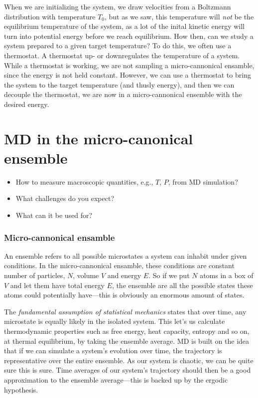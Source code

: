 \documentclass[a4paper, 11pt, notitlepage, english]{article}
\begin{document}
When we are initializing the system, we draw velocities from a Boltzmann distribution with temperature $T_0$, but as we saw, this temperature will \emph{not} be the equilibrium temperature of the system, as a lot of the inital kinetic energy will turn into potential energy before we reach equilibrium. How then, can we study a system prepared to a given target temperature? To do this, we often use a thermostat. A thermostat up- or downregulates the temperature of a system. While a thermostat is working, we are not sampling a micro-cannonical ensamble, since the energy is not held constant. However, we can use a thermostat to bring the system to the target temperature (and thusly energy), and then we can decouple the thermostat, we are now in a micro-cannonical ensemble with the desired energy. 

\clearpage


\section{MD in the micro-canonical ensemble}
\begin{itemize}
\item How to measure macroscopic quantities, e.g., $T$, $P$, from MD simulation?
\item What challenges do you expect? 
\item What can it be used for?
\end{itemize}

\subsubsection*{Micro-cannonical ensamble}


An ensemble refers to all possible microstates a system can inhabit under given conditions. In the micro-cannonical ensamble, these conditions are constant number of particles, $N$, volume $V$ and energy $E$. So if we put $N$ atoms in a box of $V$ and let them have total energy $E$, the ensemble are all the possible states these atoms could potentially have---this is obviously an enormous amount of states. 

The \emph{fundamental assumption of statistical mechanics} states that over time, any microstate is equally likely in the isolated system. This let's us calculate thermodynamic properties such as free energy, heat capacity, entropy and so on, at thermal equilibrium, by taking the ensemble average. MD is built on the idea that if we can simulate a system's evolution over time, the trajectory is representative over the entire ensemble. As our system is chaotic, we can be quite sure this is sure. Time averages of our system's trajectory should then be a good approximation to the ensemble average---this is backed up by the ergodic hypothesis.
\end{document}
